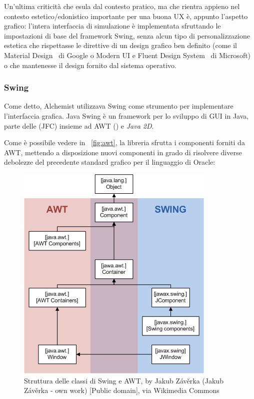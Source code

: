             Un'ultima criticità che esula dal contesto pratico, ma che rientra appieno nel contesto estetico/edonistico importante per una buona UX è, appunto l'aspetto grafico: l'intera interfaccia di simulazione è implementata sfruttando le impostazioni di base del framework Swing, senza alcun tipo di personalizzazione estetica che rispettasse le direttive di un design grafico ben definito (come il Material Design~\cite{material} di Google o Modern UI e Fluent Design System~\cite{fluent} di Microsoft) o che mantenesse il design fornito dal sistema operativo.

            \subsubsection{Swing}\label{subsub:swing}

            Come detto, Alchemist utilizzava Swing come strumento per implementare l'interfaccia grafica. Java Swing è un framework per lo sviluppo di GUI in Java, parte delle  (JFC) insieme ad AWT () e \emph{Java 2D}.

            Come è possibile vedere in \figurename~\vref{fig:awt}, la libreria sfrutta i componenti forniti da AWT, mettendo a disposizione nuovi componenti in grado di risolvere diverse debolezze del precedente standard grafico per il linguaggio di Oracle:

            \begin{figure}[htbp]\label{fig:awt}
                \includegraphics[scale=.45]{img/AWTSwing}
                \caption{Struttura delle classi di Swing e AWT, by Jakub Závěrka (Jakub Závěrka - own work) [Public domain], via Wikimedia Commons}
            \end{figure}

